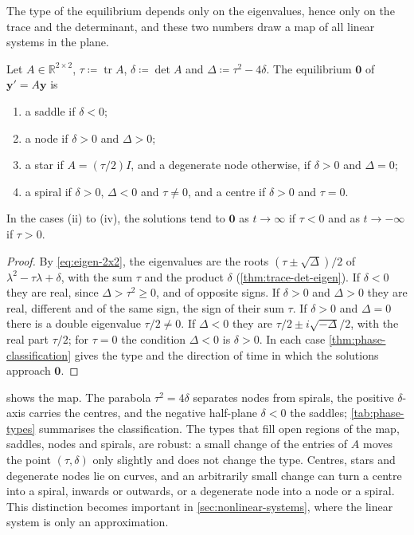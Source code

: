 The type of the equilibrium depends only on the eigenvalues, hence only on the trace and the determinant, and these two numbers draw a map of all linear systems in the plane.

\begin{theorem}
\label{thm:trace-determinant}
Let $A\in\mathbb R^{2\times2}$, $\tau\coloneqq\operatorname{tr}A$, $\delta\coloneqq\det A$ and $\Delta\coloneqq\tau^2-4\delta$. The equilibrium $\mathbf 0$ of $\mathbf y'=A\mathbf y$ is
\begin{enumerate}
\item a saddle if $\delta<0$;
\item a node if $\delta>0$ and $\Delta>0$;
\item a star if $A=(\tau/2)I$, and a degenerate node otherwise, if $\delta>0$ and $\Delta=0$;
\item a spiral if $\delta>0$, $\Delta<0$ and $\tau\ne0$, and a centre if $\delta>0$ and $\tau=0$.
\end{enumerate}
In the cases (ii) to (iv), the solutions tend to $\mathbf 0$ as $t\to\infty$ if $\tau<0$ and as $t\to-\infty$ if $\tau>0$.
\end{theorem}

\begin{proof}
By \eqref{eq:eigen-2x2}, the eigenvalues are the roots $(\tau\pm\sqrt\Delta)/2$ of $\lambda^2-\tau\lambda+\delta$, with the sum $\tau$ and the product $\delta$ (\cref{thm:trace-det-eigen}). If $\delta<0$ they are real, since $\Delta>\tau^2\ge0$, and of opposite signs. If $\delta>0$ and $\Delta>0$ they are real, different and of the same sign, the sign of their sum $\tau$. If $\delta>0$ and $\Delta=0$ there is a double eigenvalue $\tau/2\ne0$. If $\Delta<0$ they are $\tau/2\pm i\sqrt{-\Delta}/2$, with the real part $\tau/2$; for $\tau=0$ the condition $\Delta<0$ is $\delta>0$. In each case \cref{thm:phase-classification} gives the type and the direction of time in which the solutions approach $\mathbf 0$.
\end{proof}

 shows the map. The parabola $\tau^2=4\delta$ separates nodes from spirals, the positive $\delta$-axis carries the centres, and the negative half-plane $\delta<0$ the saddles; \cref{tab:phase-types} summarises the classification. The types that fill open regions of the map, saddles, nodes and spirals, are robust: a small change of the entries of $A$ moves the point $(\tau,\delta)$ only slightly and does not change the type. Centres, stars and degenerate nodes lie on curves, and an arbitrarily small change can turn a centre into a spiral, inwards or outwards, or a degenerate node into a node or a spiral. This distinction becomes important in \cref{sec:nonlinear-systems}, where the linear system is only an approximation.

